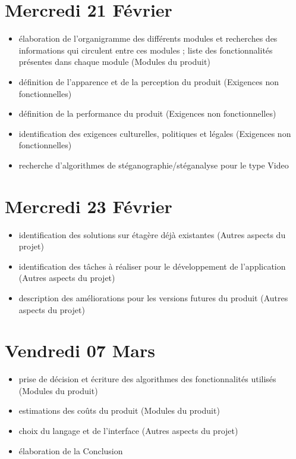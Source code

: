 \documentclass[11pt]{article}
\begin{document}
\section{Mercredi 21 Février}
\begin {itemize}
\item élaboration de l'organigramme des différents modules et recherches des informations qui circulent entre ces modules ; liste des fonctionnalités présentes dans chaque module (Modules du produit)
\item définition de l'apparence et de la perception du produit (Exigences non fonctionnelles)
\item définition de la performance du produit (Exigences non fonctionnelles)
\item identification des exigences culturelles, politiques et légales (Exigences non fonctionnelles)
\item recherche d'algorithmes de stéganographie/stéganalyse pour le type Video
\end{itemize}

\section{Mercredi 23 Février}
\begin {itemize}
\item identification des solutions sur étagère déjà existantes (Autres aspects du projet)
\item identification des tâches à réaliser pour le développement de l'application (Autres aspects du projet)
\item description des améliorations pour les versions futures du produit (Autres aspects du projet)
\end{itemize}

\section{Vendredi 07 Mars}
\begin {itemize}
\item prise de décision et écriture des algorithmes des fonctionnalités utilisés (Modules du produit)
\item estimations des coûts du produit (Modules du produit)
\item choix du langage et de l'interface (Autres aspects du projet)  
\item élaboration de la Conclusion
\end{itemize}
\end{document}
